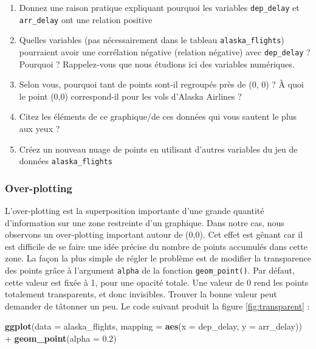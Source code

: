 \documentclass[a4paperpaper,]{article}
\newenvironment{Shaded}{\begin{snugshade}}{\end{snugshade}}
\newcommand{\DataTypeTok}[1]{\textcolor[rgb]{0.00,0.34,0.68}{#1}}
\newcommand{\FloatTok}[1]{\textcolor[rgb]{0.69,0.50,0.00}{#1}}
\newcommand{\KeywordTok}[1]{\textcolor[rgb]{0.12,0.11,0.11}{\textbf{#1}}}
\newcommand{\NormalTok}[1]{\textcolor[rgb]{0.12,0.11,0.11}{#1}}
\newcommand{\OperatorTok}[1]{\textcolor[rgb]{0.12,0.11,0.11}{#1}}
\newcommand{\StringTok}[1]{\textcolor[rgb]{0.75,0.01,0.01}{#1}}
\providecommand{\tightlist}{%
  \setlength{\itemsep}{0pt}\setlength{\parskip}{0pt}}
\begin{document}
\begin{enumerate}
\def\labelenumi{\arabic{enumi}.}
\tightlist
\item
  Donnez une raison pratique expliquant pourquoi les variables \texttt{dep\_delay} et \texttt{arr\_delay} ont une relation positive
\item
  Quelles variables (pas nécessairement dans le tableau \texttt{alaska\_flights}) pourraient avoir une corrélation négative (relation négative) avec \texttt{dep\_delay} ? Pourquoi ? Rappelez-vous que nous étudions ici des variables numériques.
\item
  Selon vous, pourquoi tant de points sont-il regroupés près de (0, 0) ? À quoi le point (0,0) correspond-il pour les vols d'Alaska Airlines ?
\item
  Citez les éléments de ce graphique/de ces données qui vous sautent le plus aux yeux ?
\item
  Créez un nouveau nuage de points en utilisant d'autres variables du jeu de données \texttt{alaska\_flights}
\end{enumerate}

\hypertarget{over-plotting}{%
\subsubsection{Over-plotting}\label{over-plotting}}

L'over-plotting est la superposition importante d'une grande quantité d'information sur une zone restreinte d'un graphique. Dans notre cas, nous observons un over-plotting important autour de (0,0). Cet effet est gênant car il est difficile de se faire une idée précise du nombre de points accumulés dans cette zone. La façon la plus simple de régler le problème est de modifier la transparence des points grâce à l'argument \texttt{alpha} de la fonction \texttt{geom\_point()}. Par défaut, cette valeur est fixée à 1, pour une opacité totale. Une valeur de 0 rend les points totalement transparents, et donc invisibles. Trouver la bonne valeur peut demander de tâtonner un peu. Le code suivant produit la figure \ref{fig:transparent} :

\begin{Shaded}
\begin{Highlighting}[]
\KeywordTok{ggplot}\NormalTok{(}\DataTypeTok{data =}\NormalTok{ alaska_flights, }
       \DataTypeTok{mapping =} \KeywordTok{aes}\NormalTok{(}\DataTypeTok{x =}\NormalTok{ dep_delay, }\DataTypeTok{y =}\NormalTok{ arr_delay)) }\OperatorTok{+}\StringTok{ }
\StringTok{  }\KeywordTok{geom_point}\NormalTok{(}\DataTypeTok{alpha =} \FloatTok{0.2}\NormalTok{)}
\end{Highlighting}
\end{Shaded}
\end{document}
